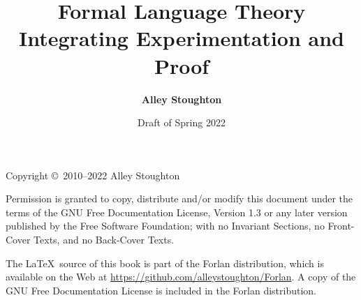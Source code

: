 \documentclass[11pt,twoside]{book}
\begin{document}

\title{\Huge\bf Formal Language Theory\\[.3cm]
\LARGE\bf Integrating Experimentation and Proof}

\author{\LARGE\bf Alley Stoughton}

\date{Draft of Spring 2022}

\titlepic{}

\maketitle

\thispagestyle{empty}

\noindent Copyright \copyright\ 2010--2022 Alley Stoughton

\vspace{.5cm}
\noindent
Permission is granted to copy, distribute and/or modify this document
under the terms of the GNU Free Documentation License, Version 1.3 or
any later version published by the Free Software Foundation; with no
Invariant Sections, no Front-Cover Texts, and no Back-Cover Texts.

The \LaTeX\ source of this book is part of the Forlan distribution,
which is available on the Web at
\url{https://github.com/alleystoughton/Forlan}.  A copy of the GNU
Free Documentation License is included in the Forlan distribution.

\clearemptydoublepage

\tableofcontents

\clearemptydoublepage

\listoffigures

\clearemptydoublepage






\clearemptydoublepage



\clearemptydoublepage



\clearemptydoublepage



\clearemptydoublepage



\clearemptydoublepage



\clearemptydoublepage







\clearemptydoublepage

{\small
\printindex}
\end{document}
